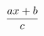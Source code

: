 \documentclass[12pt]{article}
\begin{document}
$$ \special{begin frac}\frac{\special{begin num}\special{begin *}ax\special{end *}+b\special{end num}}{\special{begin den}c\special{end den}}\special{end frac} $$
\end{document}
